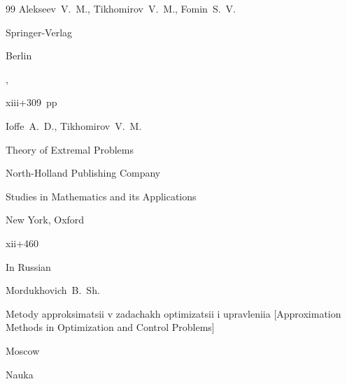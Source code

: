 \begin{thebibliography}{99}
\by  Alekseev~V.~M.,  Tikhomirov~V.~M.,  Fomin~S.~V.

\publ Springer-Verlag 

\publaddr Berlin

,


xiii+309~pp





\by Ioffe~A.~D., Tikhomirov~V.~M.

\book Theory of Extremal Problems

\publ North-Holland Publishing Company


\serial Studies in Mathematics and its Applications


\publaddr New York, Oxford

\totalpages xii+460









\lang In Russian

\by Mordukhovich~B.~Sh.

\book Metody approksimatsii v zadachakh optimizatsii i upravleniia \rm [Approximation Methods in Optimization and Control Problems]

\publaddr Moscow

\publ Nauka









\end{thebibliography}



\EngDate






